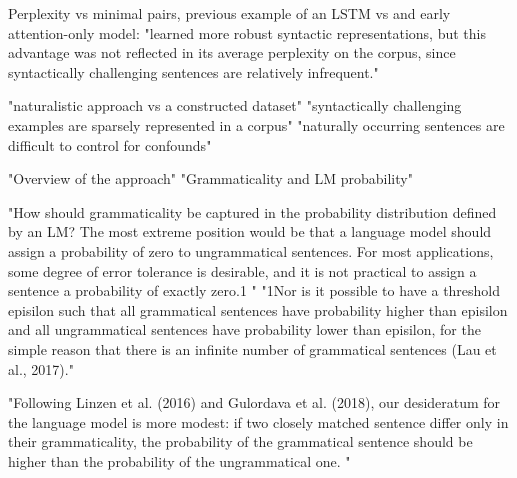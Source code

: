 
Perplexity vs minimal pairs, previous example of an LSTM vs and early attention-only model: "learned more robust syntactic representations, but this advantage was not reflected in its average perplexity on the corpus, since syntactically challenging sentences are relatively infrequent." \citep{marvin2018targeted}

"naturalistic approach vs a constructed dataset"
"syntactically challenging examples are sparsely represented in a corpus" "naturally occurring sentences are difficult to control for confounds" \citep{marvin2018targeted}

"Overview of the approach"
"Grammaticality and LM probability" \citep{marvin2018targeted}

"How should grammaticality be captured in the probability distribution defined by an LM? The most extreme position would be that a language model should assign a probability of zero to ungrammatical sentences. For most applications, some degree of error tolerance is desirable, and  it is not practical to assign a sentence a probability of exactly zero.1 " "1Nor is it possible to have a threshold episilon such that all grammatical sentences have probability higher than episilon and all ungrammatical sentences have probability lower than episilon, for the simple reason that there is an infinite number of grammatical sentences (Lau et al., 2017)."  \citep{marvin2018targeted}

"Following Linzen et al. (2016) and Gulordava et al. (2018), our desideratum for the language model is more modest: if two closely matched sentence differ only in their grammaticality, the probability of the grammatical sentence should be higher than the probability of the ungrammatical one. "  \citep{marvin2018targeted}

